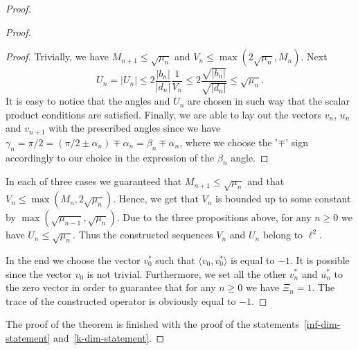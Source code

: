 \begin{proof}
\begin{proof}
\begin{proof}
            Trivially, we have $M_{n+1} \leq \sqrt{\mu_n}$ and $V_n \leq \max(2\sqrt{\mu_n}, M_n)$.
            Next
            \[
              U_n = |U_n| \leq 2 \frac{|b_n|}{|d_n|} \frac{1}{V_n} \leq 2 \frac{\sqrt{|b_n|}}{\sqrt{|d_n|}} \leq \sqrt{\mu_n}.
            \]
            It is easy to notice that the angles and $U_n$ are chosen in such way that the scalar product conditions are satisfied.
            Finally, we are able to lay out the vectors $v_n$, $u_n$ and $v_{n+1}$ with the prescribed angles 
              since we have $\gamma_n = \pi/2 = (\pi/2 \pm \alpha_n) \mp \alpha_n = \beta_n \mp \alpha_n$,
              where we choose the '$\mp$' sign accordingly to our choice in the expression of the $\beta_n$ angle.
          \end{proof}
        In each of three cases we guaranteed that $M_{n+1} \leq \sqrt{\mu_n}$ and
          that $V_n \leq \max(M_n, 2\sqrt{\mu_n})$.
        Hence, we get that $V_n$ is bounded up to some constant by $\max(\sqrt{\mu_{n-1}}, \sqrt{\mu_n})$.
        Due to the three propositions above, for any $n \geq 0$ we have $U_n \leq \sqrt{\mu_n}$.
        Thus the constructed sequences $V_n$ and $U_n$ belong to $\ell^2$.

        In the end we choose the vector $v_0^*$ such that $\langle v_0, v_0^*\rangle$ is equal to $-1$.
        It is possible since the vector $v_0$ is not trivial.
        Furthermore, we set all the other $v^*_n$ and $u^*_n$ to the zero vector in order to guarantee that for any $n \geq 0$ we have $\Xi_n = 1$.
        The trace of the constructed operator is obviously equal to $-1$.
      \end{proof}
      The proof of the theorem is finished with the proof of the statements~\ref{inf-dim-statement} and~\ref{k-dim-statement}.
    \end{proof}
